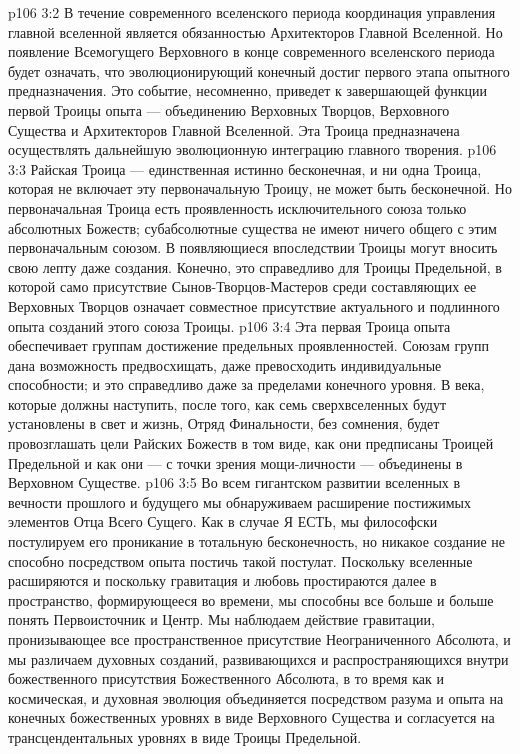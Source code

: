 \vs p106 3:2 В течение современного вселенского периода координация управления главной вселенной является обязанностью Архитекторов Главной Вселенной. Но появление Всемогущего Верховного в конце современного вселенского периода будет означать, что эволюционирующий конечный достиг первого этапа опытного предназначения. Это событие, несомненно, приведет к завершающей функции первой Троицы опыта --- объединению Верховных Творцов, Верховного Существа и Архитекторов Главной Вселенной. Эта Троица предназначена осуществлять дальнейшую эволюционную интеграцию главного творения.
\vs p106 3:3 Райская Троица --- единственная истинно бесконечная, и ни одна Троица, которая не включает эту первоначальную Троицу, не может быть бесконечной. Но первоначальная Троица есть проявленность исключительного союза только абсолютных Божеств; субабсолютные существа не имеют ничего общего с этим первоначальным союзом. В появляющиеся впоследствии Троицы могут вносить свою лепту даже создания. Конечно, это справедливо для Троицы Предельной, в которой само присутствие Сынов\hyp{}Творцов\hyp{}Мастеров среди составляющих ее Верховных Творцов означает совместное присутствие актуального и подлинного опыта созданий  этого союза Троицы.
\vs p106 3:4 Эта первая Троица опыта обеспечивает группам достижение предельных проявленностей. Союзам групп дана возможность предвосхищать, даже превосходить индивидуальные способности; и это справедливо даже за пределами конечного уровня. В века, которые должны наступить, после того, как семь сверхвселенных будут установлены в свет и жизнь, Отряд Финальности, без сомнения, будет провозглашать цели Райских Божеств в том виде, как они предписаны Троицей Предельной и как они --- с точки зрения мощи\hyp{}личности --- объединены в Верховном Существе.
\vs p106 3:5 \pc Во всем гигантском развитии вселенных в вечности прошлого и будущего мы обнаруживаем расширение постижимых элементов Отца Всего Сущего. Как в случае Я ЕСТЬ, мы философски постулируем его проникание в тотальную бесконечность, но никакое создание не способно посредством опыта постичь такой постулат. Поскольку вселенные расширяются и поскольку гравитация и любовь простираются далее в пространство, формирующееся во времени, мы способны все больше и больше понять Первоисточник и Центр. Мы наблюдаем действие гравитации, пронизывающее все пространственное присутствие Неограниченного Абсолюта, и мы различаем духовных созданий, развивающихся и распространяющихся внутри божественного присутствия Божественного Абсолюта, в то время как и космическая, и духовная эволюция объединяется посредством разума и опыта на конечных божественных уровнях в виде Верховного Существа и согласуется на трансцендентальных уровнях в виде Троицы Предельной.
